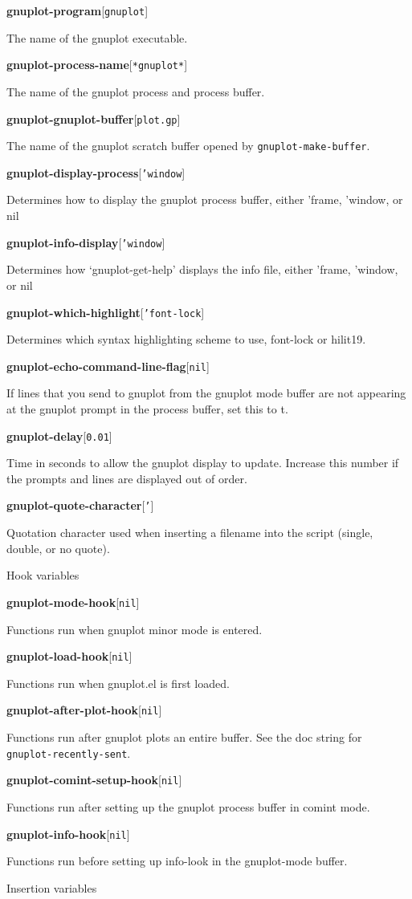 \documentclass[twocolumn]{article}
\newenvironment{Boxedminipage}%
{\begin{Sbox}\begin{minipage}}%
  {\end{minipage}\end{Sbox}\Ovalbox{\TheSbox}}
\def\variable#1#2#3{{
    \vspace{-0.2truecm}
    \begin{flushright}
      \begin{minipage}[h]{0.97\linewidth}
        \vspace{-0.2truecm}
        \textbf{#1}\hfill[\texttt{#2}]
        \begin{flushright}
          \begin{minipage}[h]{0.93\linewidth}
            \vspace{-0.2truecm}
            #3
          \end{minipage}
        \end{flushright}
      \end{minipage}
    \end{flushright}
    }}
\begin{document}
\variable{gnuplot-program}{gnuplot}{The name of the gnuplot
  executable.}
%
\variable{gnuplot-process-name}{*gnuplot*}{The name of the gnuplot
  process and process buffer.}
%
\variable{gnuplot-gnuplot-buffer}{plot.gp}{The name of the gnuplot
  scratch buffer opened by \texttt{gnuplot-make-buffer}.}
%
%
\variable{gnuplot-display-process}{'window}{Determines how to display
  the gnuplot process buffer, either 'frame, 'window, or nil}
%
\variable{gnuplot-info-display}{'window}{Determines how
  `gnuplot-get-help' displays the info file, either 'frame, 'window,
  or nil}
%
\variable{gnuplot-which-highlight}{'font-lock}{Determines which syntax
  highlighting scheme to use, font-lock or hilit19.}
%
\variable{gnuplot-echo-command-line-flag}{nil}{If lines that you send to
  gnuplot from the gnuplot mode buffer are not appearing at the
  gnuplot prompt in the process buffer, set this to t.}
%
\variable{gnuplot-delay}{0.01}{Time in seconds to allow the gnuplot
  display to update.  Increase this number if the prompts and lines
  are displayed out of order.}
%
\variable{gnuplot-quote-character}{'}{Quotation character used when
  inserting a filename into the script (single, double, or no quote).}


\begin{center}
  \begin{Boxedminipage}{0.75\linewidth}
    \begin{center}
      {\large Hook variables}
    \end{center}
  \end{Boxedminipage}
\end{center}

\variable{gnuplot-mode-hook}{nil}{Functions run when gnuplot minor
  mode is entered.}
%
\variable{gnuplot-load-hook}{nil}{Functions run when gnuplot.el is
  first loaded.}
%
\variable{gnuplot-after-plot-hook}{nil}{Functions run after gnuplot
  plots an entire buffer.  See the doc string for
  \texttt{gnuplot-recently-sent}.}
%
\variable{gnuplot-comint-setup-hook}{nil}{Functions run after setting
  up the gnuplot process buffer in comint mode.}
%
\variable{gnuplot-info-hook}{nil}{Functions run before setting up
  info-look in the gnuplot-mode buffer.}
%



\vfill\eject


\begin{center}
  \begin{Boxedminipage}{0.75\linewidth}
    \begin{center}
      {\large Insertion variables}
    \end{center}
  \end{Boxedminipage}
\end{center}
\end{document}
